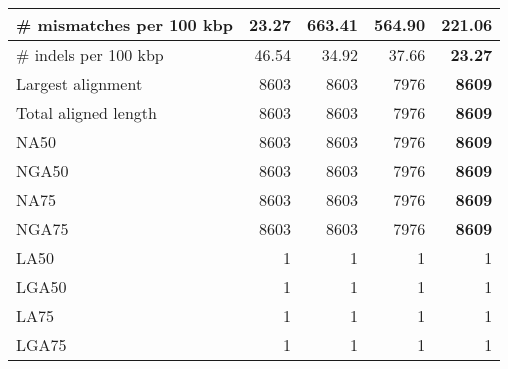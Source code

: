 \documentclass[12pt,a4paper]{article}
\begin{document}
\begin{table}[ht]
\begin{center}
\begin{tabular}{|l*{4}{|r}|}
\# mismatches per 100 kbp & {\bf 23.27} & 663.41 & 564.90 & 221.06 \\ \hline
\# indels per 100 kbp & 46.54 & 34.92 & 37.66 & {\bf 23.27} \\ \hline
Largest alignment & 8603 & 8603 & 7976 & {\bf 8609} \\ \hline
Total aligned length & 8603 & 8603 & 7976 & {\bf 8609} \\ \hline
NA50 & 8603 & 8603 & 7976 & {\bf 8609} \\ \hline
NGA50 & 8603 & 8603 & 7976 & {\bf 8609} \\ \hline
NA75 & 8603 & 8603 & 7976 & {\bf 8609} \\ \hline
NGA75 & 8603 & 8603 & 7976 & {\bf 8609} \\ \hline
LA50 & 1 & 1 & 1 & 1 \\ \hline
LGA50 & 1 & 1 & 1 & 1 \\ \hline
LA75 & 1 & 1 & 1 & 1 \\ \hline
LGA75 & 1 & 1 & 1 & 1 \\ \hline
\end{tabular}
\end{center}
\end{table}
\end{document}
